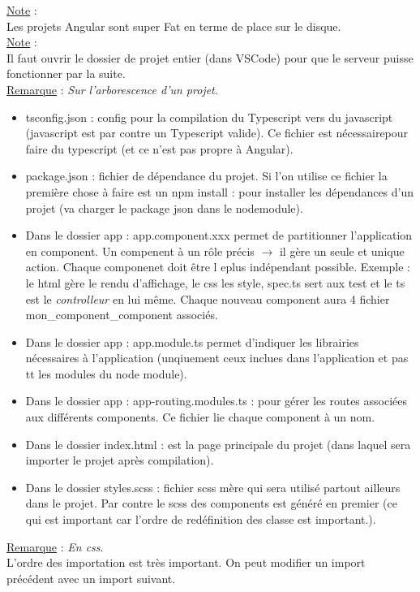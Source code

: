 \documentclass[a4paper,12pt,twoside]{article}
\newcommand{\incode}[1]{{\footnotesize\ttfamily #1}} %
\newcommand{\rem}[2]{\noindent\underline{Remarque} : \textit{#1}.\\ \indent #2}
\newcommand{\note}[1]{\noindent\underline{Note} : \\ \indent #1}
\begin{document}
\note{Les projets Angular sont super Fat en terme de place sur le disque.}\\

\note{Il faut ouvrir le dossier de projet entier (dans VSCode) pour que le serveur puisse fonctionner par la suite.}\\

\rem{Sur l'arborescence d'un projet}{
\begin{itemize}
\item \incode{tsconfig.json} : config pour la compilation du Typescript vers du javascript (javascript est par contre un Typescript valide). Ce fichier est nécessairepour faire du typescript (et ce n'est pas propre à Angular).
\item \incode{package.json} : fichier de dépendance du projet. Si l'on utilise ce fichier la première chose à faire est un \incode{npm install} : pour installer les dépendances d'un projet (va charger le package json dans le nodemodule).
\item Dans le dossier \incode{app} : \incode{app.component.xxx} permet de partitionner l'application en component. Un compenent à un rôle précis $\to$ il gère un seule et unique action. Chaque componenet doit être l eplus indépendant possible. Exemple : le html gère le rendu d'affichage, le css les style, spec.ts sert aux test et le ts est le \textit{controlleur} en lui même. Chaque nouveau component aura 4 fichier mon\_component\_component associés.
\item Dans le dossier \incode{app} : \incode{app.module.ts} permet d'indiquer les librairies nécessaires à l'application (unqiuement ceux inclues dans l'application et pas tt les modules du node module).
\item Dans le dossier \incode{app} : \incode{app-routing.modules.ts} : pour gérer les routes associées aux différents components. Ce fichier lie chaque component à un nom.
\item Dans le dossier \incode{index.html} : est la page principale du projet (dans laquel sera importer le projet après compilation).
\item Dans le dossier \incode{styles.scss} : fichier scss mère qui sera utilisé partout ailleurs dans le projet. Par contre le scss des components est généré en premier (ce qui est important car l'ordre de redéfinition des classe est important.).\\
\end{itemize}
}

\rem{En css}{L'ordre des importation est très important. On peut modifier un import précédent avec un import suivant.}\\
\end{document}
